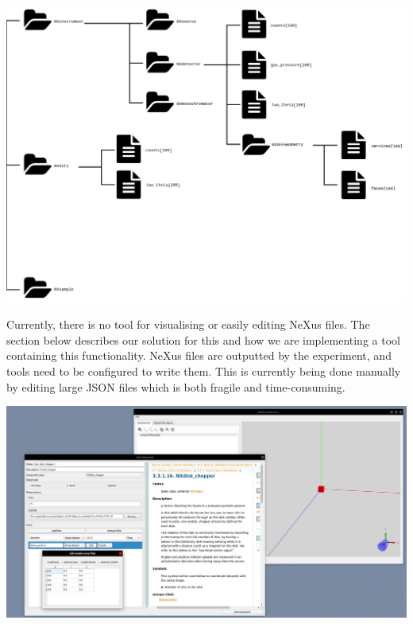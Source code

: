 \documentclass[usenames,dvipsnames]{beamer}
\begin{document}
\begin{frame}[t]
\begin{columns}[t]
\begin{column}{0.47\paperwidth}
\begin{tcolorbox}[colback=white,colframe=white,title=Scientific Facilities and the NeXus Standard,coltitle=blue]
\includegraphics[width=\linewidth]{nexusdiagram.png}


Currently, there is no tool for visualising or easily editing NeXus files. The section below describes our solution for this and how we are implementing a tool containing this functionality. NeXus files are outputted by the experiment, and tools need to be configured to write them. This is currently being done manually by editing large JSON files which is both fragile and time-consuming. 

\end{tcolorbox}

\bigskip

\begin{tcolorbox}[colback=white,colframe=white,title=The NeXus Constructor,coltitle=blue]
\bigskip
\includegraphics[width=\linewidth]{screenshot.png}



\lipsum[2]
\end{tcolorbox}


\end{column}
\end{columns}
\end{frame}
\end{document}

